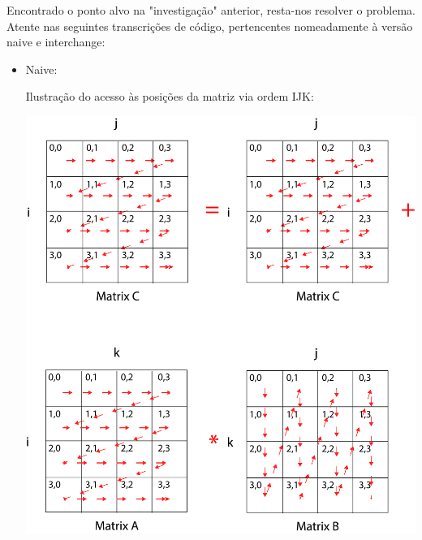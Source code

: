 \documentclass[conference,compsoc]{IEEEtran}
\begin{document}
                                                                                                                                                                                                                       Encontrado o ponto alvo na "investigação" anterior, resta-nos resolver o problema. Atente nas seguintes transcrições de código, pertencentes nomeadamente à versão naive e interchange:
                                                                                                                                                                                                                       \begin{itemize}
                                                                                                                                                                                                                       \item{ Naive: \par  %
                                                                                                                                                                                                                         Ilustração do acesso às posições da matriz via ordem IJK:\par 
                                                                                                                                                                                                                           \includegraphics[width=0.75\columnwidth]{PNG/matrix_ijk_final.png}
                                                                                                                                                                                                                       }



\end{itemize}
\end{document}
